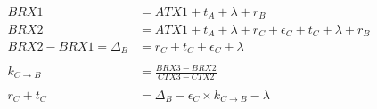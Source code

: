 \documentclass{article}
\begin{document}
\begin{align}
  BRX1 &= ATX1 + t_A + \lambda + r_B \\
  BRX2 &= ATX1 + t_A + \lambda + r_C + \epsilon_C + t_C + \lambda + r_B \\
  BRX2-BRX1 = \Delta_B &= r_C + t_C + \epsilon_C + \lambda \\
  ~\nonumber\\
  k_{C\rightarrow B} &= \frac{BRX3-BRX2}{CTX3-CTX2} \\
  ~\nonumber\\
  r_C + t_C &= \Delta_B - \epsilon_C \times k_{C\rightarrow B} - \lambda
\end{align}
\end{document}
